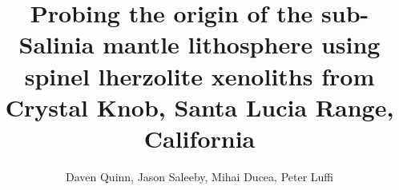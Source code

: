\documentclass[letterpaper,12pt]{article}
\title{Probing the origin of the sub-Salinia mantle lithosphere using spinel lherzolite xenoliths from Crystal Knob, Santa Lucia Range, California}
\author{Daven Quinn, Jason Saleeby, Mihai Ducea, Peter Luffi}
\begin{document}
	\maketitle
\doublespacing

\begin{abstract}

\end{abstract}



\pagebreak

\begin{singlespace}


\end{singlespace}
\end{document}
